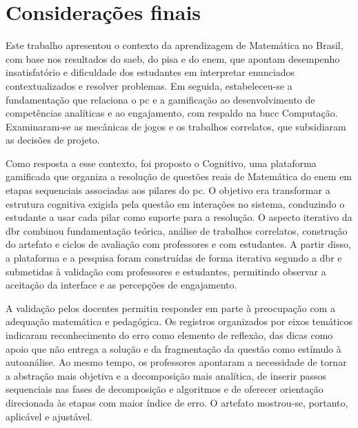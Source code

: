
\chapter{Considerações finais}
\label{ch:conc}

Este trabalho apresentou o contexto da aprendizagem de Matemática no Brasil, com base nos resultados do \gls{saeb}, do \gls{pisa} e do \gls{enem}, que apontam desempenho insatisfatório e dificuldade dos estudantes em interpretar enunciados contextualizados e resolver problemas. Em seguida, estabeleceu-se a fundamentação que relaciona o \gls{pc} e a gamificação ao desenvolvimento de competências analíticas e ao engajamento, com respaldo na \gls{bncc} Computação. Examinaram-se as mecânicas de jogos e os trabalhos correlatos, que subsidiaram as decisões de projeto. 

Como resposta a esse contexto, foi proposto o Cognitivo, uma plataforma gamificada que organiza a resolução de questões reais de Matemática do \gls{enem} em etapas sequenciais associadas aos pilares do \gls{pc}. O objetivo era transformar a estrutura cognitiva exigida pela questão em interações no sistema, conduzindo o estudante a usar cada pilar como suporte para a resolução. O aspecto iterativo da \gls{dbr} combinou fundamentação teórica, análise de trabalhos correlatos, construção do artefato e ciclos de avaliação com professores e com estudantes. A partir disso, a plataforma e a pesquisa foram construídas de forma iterativa segundo a \gls{dbr} e submetidas à validação com professores e estudantes, permitindo observar a aceitação da interface e as percepções de engajamento.

A validação pelos docentes permitiu responder em parte à preocupação com a adequação matemática e pedagógica. Os registros organizados por eixos temáticos indicaram reconhecimento do erro como elemento de reflexão, das dicas como apoio que não entrega a solução e da fragmentação da questão como estímulo à autoanálise. Ao mesmo tempo, os professores apontaram a necessidade de tornar a abstração mais objetiva e a decomposição mais analítica, de inserir passos sequenciais nas fases de decomposição e algoritmos e de oferecer orientação direcionada às etapas com maior índice de erro. O artefato mostrou-se, portanto, aplicável e ajustável.

